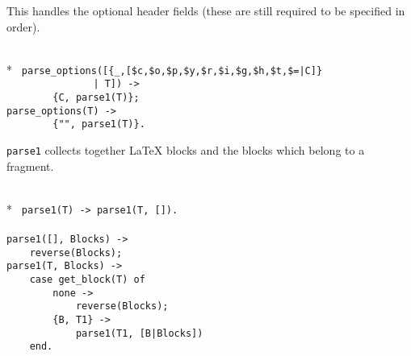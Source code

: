 This handles the optional header fields (these are still required to be
specified in order).

\begin{flushleft}
\label{parsing_3_13}
\\*
\tt
\noindent{}%
\verb&parse_options([{_,[$c,$o,$p,$y,$r,$i,$g,$h,$t,$=|C]}&\\
\noindent{}%
\verb&               | T]) ->&\\
\noindent{}%
\verb&        {C, parse1(T)};&\\
\noindent{}%
\verb&parse_options(T) ->&\\
\noindent{}%
\verb&        {"", parse1(T)}.&\\
\end{flushleft}

    \verb+parse1+ collects together \LaTeX{} blocks and the blocks which
belong to a fragment.

\begin{flushleft}
\label{parsing_4_13}
\\*
\tt
\noindent{}%
\verb&parse1(T) -> parse1(T, []).&\\
\noindent{}%
\verb&&\\
\noindent{}%
\verb&parse1([], Blocks) ->&\\
\noindent{}%
\verb&    reverse(Blocks);&\\
\noindent{}%
\verb&parse1(T, Blocks) ->&\\
\noindent{}%
\verb&    case get_block(T) of&\\
\noindent{}%
\verb&        none ->&\\
\noindent{}%
\verb&            reverse(Blocks);&\\
\noindent{}%
\verb&        {B, T1} ->&\\
\noindent{}%
\verb&            parse1(T1, [B|Blocks])&\\
\noindent{}%
\verb&    end.&\\
\end{flushleft}

